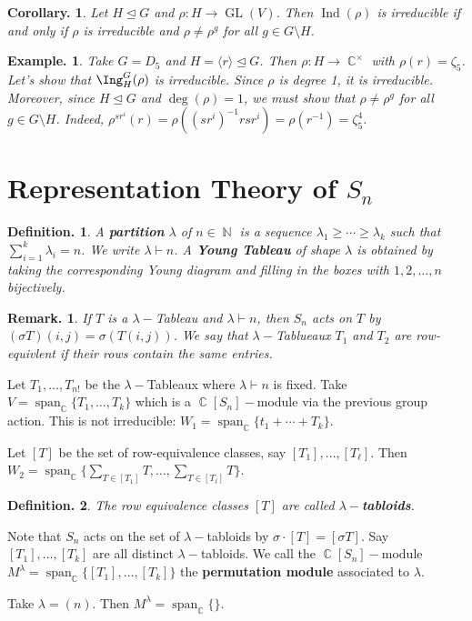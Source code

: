 \documentclass[11pt, a4paper]{memoir}
\DeclareMathOperator{\N}{{\mathbb{N}}}
\DeclareMathOperator{\C}{{\mathbb{C}}}
\theoremstyle{change}
\newtheorem{corollary}[theorem]{Corollary.}
\theoremstyle{plain}
\theoremstyle{nonumberplain}
\newtheorem{definition}{Definition.}
\newtheorem{example}{Example.}
\newtheorem{remark}{Remark.}
\DeclareMathOperator{\GL}{GL}
\DeclareMathOperator{\spn}{span}
\DeclareMathOperator{\Ind}{Ind}
\numberwithin{equation}{section}
\begin{document}
\begin{corollary}
    Let $H\trianglelefteq G$ and $\rho:H\to\GL(V)$.
    Then $\Ind(\rho)$ is irreducible if and only if $\rho$ is irreducible and $\rho\neq\rho^g$ for all $g\in G\setminus H$.
\end{corollary}
\begin{example}
    Take $G=D_5$ and $H=\langle r\rangle\trianglelefteq G$.
    Then $\rho:H\to\C^\times$ with $\rho(r)=\zeta_5$.
    Let's show that $\Ing_H^G(\rho)$ is irreducible.
    Since $\rho$ is degree 1, it is irreducible.
    Moreover, since $H\trianglelefteq G$ and $\deg(\rho)=1$, we must show that $\rho\neq\rho^g$ for all $g\in G\setminus H$.
    Indeed, $\rho^{sr^i}(r)=\rho((sr^i)^{-1}rsr^i)=\rho(r^{-1})=\zeta_5^4$.
\end{example}
\section{Representation Theory of $S_n$}
\begin{definition}
    A \textbf{partition} $\lambda$ of $n\in\N$ is a sequence $\lambda_1\geq\cdots\geq\lambda_k$ such that $\sum_{i=1}^k\lambda_i=n$.
    We write $\lambda\vdash n$.
    A \textbf{Young Tableau} of shape $\lambda$ is obtained by taking the corresponding Young diagram and filling in the boxes with $1,2,\ldots,n$ bijectively.
\end{definition}
\begin{remark}
    If $T$ is a $\lambda-$Tableau and $\lambda\vdash n$, then $S_n$ acts on $T$ by $(\sigma T)(i,j)=\sigma(T(i,j))$.
    We say that $\lambda-$Tablueaux $T_1$ and $T_2$ are row-equivlent if their rows contain the same entries.
\end{remark}
Let $T_1,\ldots,T_{n!}$ be the $\lambda-$Tableaux where $\lambda\vdash n$ is fixed.
Take $V=\spn_{\C}\{T_1,\ldots,T_k\}$ which is a $\C[S_n]-$module via the previous group action.
This is not irreducible: $W_1=\spn_{\C}\{t_1+\cdots+T_k\}$.

Let $[T]$ be the set of row-equivalence classes, say $[T_1],\ldots,[T_\ell]$.
Then $W_2=\spn_{\C}\{\sum_{T\in[T_1]}T,\ldots,\sum_{T\in[T_\ell]}T\}$.
\begin{definition}
    The row equivalence classes $[T]$ are called \textbf{$\lambda-$tabloids}.
\end{definition}
Note that $S_n$ acts on the set of $\lambda-$tabloids by $\sigma\cdot[T]=[\sigma T]$.
Say $[T_1],\ldots,[T_k]$ are all distinct $\lambda-$tabloids.
We call the $\C[S_n]-$module $M^\lambda=\spn_{\C}\{[T_1],\ldots,[T_k]\}$ the \textbf{permutation module} associated to $\lambda$.

Take $\lambda=(n)$.
Then $M^\lambda=\spn_{\C}\{\}$.
\end{document}
